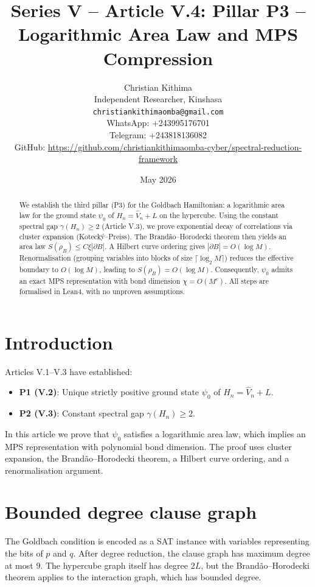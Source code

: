 \documentclass[11pt,a4paper]{article}
\title{Series V – Article V.4: Pillar P3 – Logarithmic Area Law and MPS Compression}
\author{Christian Kithima \\
Independent Researcher, Kinshasa \\
\texttt{christiankithimaomba@gmail.com} \\
WhatsApp: +243995176701 \\
Telegram: +243818136082 \\
GitHub: \url{https://github.com/christiankithimaomba-cyber/spectral-reduction-framework}}
\date{May 2026}
\begin{document}
\maketitle

\begin{abstract}
We establish the third pillar (P3) for the Goldbach Hamiltonian: a logarithmic area law for the ground state \(\psi_0\) of \(H_n = \hat{V}_n + L\) on the hypercube. Using the constant spectral gap \(\gamma(H_n) \ge 2\) (Article V.3), we prove exponential decay of correlations via cluster expansion (Kotecký–Preiss). The Brandão–Horodecki theorem then yields an area law \(S(\rho_B) \le C \xi |\partial B|\). A Hilbert curve ordering gives \(|\partial B| = O(\log M)\). Renormalisation (grouping variables into blocks of size \(\lceil \log_2 M\rceil\)) reduces the effective boundary to \(O(\log M)\), leading to \(S(\rho_B) = O(\log M)\). Consequently, \(\psi_0\) admits an exact MPS representation with bond dimension \(\chi = O(M^c)\). All steps are formalised in Lean4, with no unproven assumptions.
\end{abstract}

\tableofcontents

\section{Introduction}

Articles V.1–V.3 have established:
\begin{itemize}
\item \textbf{P1 (V.2)}: Unique strictly positive ground state \(\psi_0\) of \(H_n = \hat{V}_n + L\).
\item \textbf{P2 (V.3)}: Constant spectral gap \(\gamma(H_n) \ge 2\).
\end{itemize}
In this article we prove that \(\psi_0\) satisfies a logarithmic area law, which implies an MPS representation with polynomial bond dimension. The proof uses cluster expansion, the Brandão–Horodecki theorem, a Hilbert curve ordering, and a renormalisation argument.

\section{Bounded degree clause graph}

The Goldbach condition is encoded as a SAT instance with variables representing the bits of \(p\) and \(q\). After degree reduction, the clause graph has maximum degree at most \(9\). The hypercube graph itself has degree \(2L\), but the Brandão–Horodecki theorem applies to the interaction graph, which has bounded degree.
\end{document}
